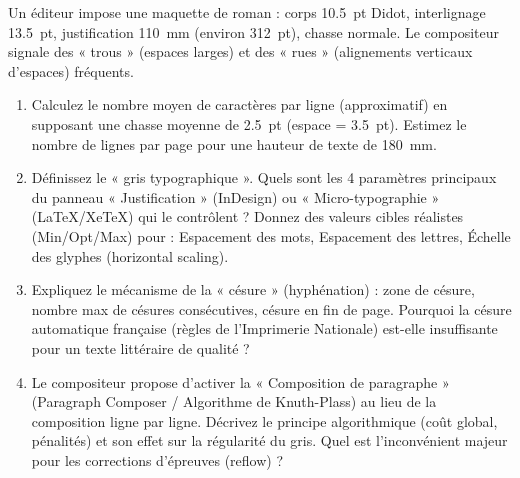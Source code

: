 \documentclass[11pt]{article}
\begin{document}
\begin{exercice}
Un éditeur impose une maquette de roman : corps \SI{10.5}{pt} Didot, interlignage \SI{13.5}{pt}, justification \SI{110}{\milli\meter} (environ \SI{312}{pt}), chasse normale. Le compositeur signale des « trous » (espaces larges) et des « rues » (alignements verticaux d'espaces) fréquents.
\begin{enumerate}
    \item Calculez le nombre moyen de caractères par ligne (approximatif) en supposant une chasse moyenne de \SI{2.5}{pt} (espace = \SI{3.5}{pt}). Estimez le nombre de lignes par page pour une hauteur de texte de \SI{180}{\milli\meter}.
    \item Définissez le « gris typographique ». Quels sont les 4 paramètres principaux du panneau « Justification » (InDesign) ou « Micro-typographie » (LaTeX/XeTeX) qui le contrôlent ? Donnez des valeurs cibles réalistes (Min/Opt/Max) pour : Espacement des mots, Espacement des lettres, Échelle des glyphes (horizontal scaling).
    \item Expliquez le mécanisme de la « césure » (hyphénation) : zone de césure, nombre max de césures consécutives, césure en fin de page. Pourquoi la césure automatique française (règles de l'Imprimerie Nationale) est-elle insuffisante pour un texte littéraire de qualité ?
    \item Le compositeur propose d'activer la « Composition de paragraphe » (Paragraph Composer / Algorithme de Knuth-Plass) au lieu de la composition ligne par ligne. Décrivez le principe algorithmique (coût global, pénalités) et son effet sur la régularité du gris. Quel est l'inconvénient majeur pour les corrections d'épreuves (reflow) ?
\end{enumerate}
\end{exercice}
\end{document}
